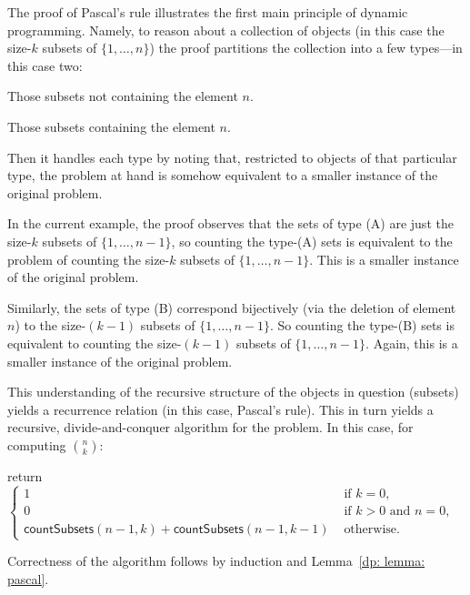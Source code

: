 The proof of Pascal's rule illustrates the first main principle of dynamic programming.
Namely, to reason about a collection of objects
(in this case the size-$k$ subsets of $\{1,\ldots,n\}$)
the proof partitions the collection into a few types---in this case two:
\begin{mylist}
\item[(A)] Those subsets not containing the element $n$.
\item[(B)] Those subsets containing the element $n$.
\end{mylist}
Then it handles each type
by noting that, restricted to objects of that particular type,
the problem at hand is somehow equivalent to a smaller instance of the original problem.

In the current example, the proof observes that the sets of type (A) are just the size-$k$ subsets of $\{1,\ldots,n-1\}$,
so counting the type-(A) sets is equivalent to the problem of counting the size-$k$ subsets of $\{1,\ldots,n-1\}$.
This is a smaller instance of the original problem.

Similarly, the sets of type (B) correspond bijectively (via the deletion of element $n$)
to the size-$(k-1)$ subsets of $\{1,\ldots,n-1\}$.
So counting the type-(B) sets is equivalent to counting the size-$(k-1)$ subsets of $\{1,\ldots,n-1\}$.
Again, this is a smaller instance of the original problem.

This understanding of the recursive structure of the objects in question (subsets)
yields a recurrence relation (in this case, Pascal's rule).
This in turn yields a recursive, divide-and-conquer algorithm for the problem.
In this case, for computing $n \choose k$:

\smallskip

\begin{myframed}
  \begin{steps}
  \item[{\textsf{countSubsets}$(n, k)$:}] 
    \step return
    $\begin{cases} 1 & \text{ if } k=0, \\
      0 & \text{ if } k > 0 \text{ and } n = 0,\\
      \textsf{countSubsets}(n-1, k) + \textsf{countSubsets}(n-1, k-1) & \text{ otherwise.}
    \end{cases}$
  \end{steps}
\end{myframed}

Correctness of the algorithm follows by induction and Lemma~\ref{dp: lemma: pascal}.

